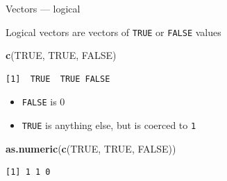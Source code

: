 \documentclass[10pt,ignorenonframetext,compress, aspectratio=169]{beamer}
\newenvironment{Shaded}{\begin{snugshade}}{\end{snugshade}}
\newcommand{\KeywordTok}[1]{\textcolor[rgb]{0.13,0.29,0.53}{\textbf{{#1}}}}
\newcommand{\OtherTok}[1]{\textcolor[rgb]{0.56,0.35,0.01}{{#1}}}
\newcommand{\NormalTok}[1]{{#1}}
\begin{document}
\begin{frame}[fragile]{Vectors --- logical}

Logical vectors are vectors of \texttt{TRUE} or \texttt{FALSE} values

\scriptsize

\begin{Shaded}
\begin{Highlighting}[]
\KeywordTok{c}\NormalTok{(}\OtherTok{TRUE}\NormalTok{, }\OtherTok{TRUE}\NormalTok{, }\OtherTok{FALSE}\NormalTok{)}
\end{Highlighting}
\end{Shaded}

\begin{verbatim}
[1]  TRUE  TRUE FALSE
\end{verbatim}

\normalsize

\begin{itemize}
\itemsep1pt\parskip0pt
\item
  \texttt{FALSE} is 0
\item
  \texttt{TRUE} is anything else, but is coerced to \texttt{1}
\end{itemize}

\scriptsize

\begin{Shaded}
\begin{Highlighting}[]
\KeywordTok{as.numeric}\NormalTok{(}\KeywordTok{c}\NormalTok{(}\OtherTok{TRUE}\NormalTok{, }\OtherTok{TRUE}\NormalTok{, }\OtherTok{FALSE}\NormalTok{))}
\end{Highlighting}
\end{Shaded}

\begin{verbatim}
[1] 1 1 0
\end{verbatim}

\normalsize

\end{frame}
\end{document}

